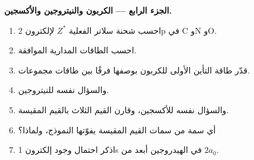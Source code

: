 \begin{problem}
\medskip
\noindent\textbf{الجزء الرابع --- الكربون والنيتروجين والأكسجين.}
\begin{enumerate}[resume]
  \item احسب شحنة سلاتر الفعلية $Z^*$ لإلكترون 2p في C وN وO.
  \item احسب الطاقات المدارية الموافقة.
  \item قدّر طاقة التأين الأولى للكربون بوصفها فرقًا بين طاقات
        مجموعات.
  \item والسؤال نفسه للنيتروجين.
  \item والسؤال نفسه للأكسجين، وقارن القيم الثلاث بالقيم المقيسة.
  \item أي سمة من سمات القيم المقيسة يفوّتها النموذج، ولماذا؟
  \item اذكر احتمال وجود إلكترون 1s في الهيدروجين أبعد
        من $2a_0$.
\end{enumerate}
\end{problem}
